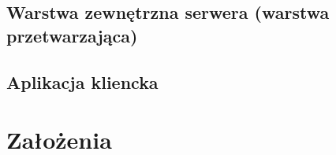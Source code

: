 \par{}

\subsection*[Warstwa zewnętrzna serwera]{Warstwa zewnętrzna serwera (warstwa przetwarzająca)}

\par{}

\subsection*[Aplikacja kliencka]{Aplikacja kliencka}

\par{}


\section[Założenia]{Założenia} \label{sec:zalozenia}


